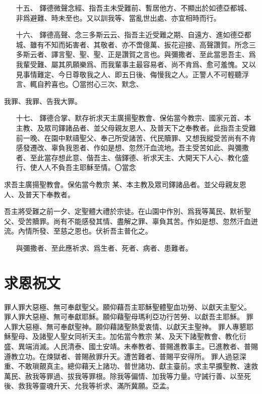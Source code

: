\begin{enumerate}
    \item[十五、]{\small 鐸德微聲念經、指吾主未受難前、暫居他方、不顯出於如德亞都城、非爲避難、時未至也。又以訓我等、當亂世出處、亦宜相時而行。}
    \item[十六、]{\small 鐸德高聲、念三多斯云云、指吾主近受難之期、自遠方、進如德亞都城、雖有不知而妬害者、其敬者、亦不啻億萬、扳花迎接、高聲讚賀。所念三多斯云者、譯言聖、聖、聖、正是讚賀之言也。與彌撒者、至此當思吾主、爲我輩受難、屬其夙願樂爲、而我輩事主最容易者、尚不肯爲、愈可羞愧。又以見事情難定、今日尊敬我之人、即五日後、侮慢我之人。正警人不可輕聽浮言、輒自矜喜也。〇當拊心三次、默念、}
\end{enumerate}
我罪、我罪、告我大罪。
\begin{enumerate}
    \item[十七、]{\small 鐸德合掌、默存祈求天主廣揚聖教會、保佑當今教宗、國家元首、本主教、及眾司鐸諸品者、並父母親友恩人、及普天下之奉教者。此指吾主受難前一晚、在園中默禱聖父、奉己所受諸苦、代民贖罪、又想我縱受苦尚有不肯感發遷改、辜負我恩者、作如是想、忽然汗血流地。吾主受苦如此、與彌撒者、至此當存想此意、偕吾主、偕鐸德、祈求天主、大開天下人心、教化盛行、使人人不負吾主耶穌至情。〇當念}
\end{enumerate}
求吾主廣揚聖教會。保佑當今教宗 某、本主教及眾司鐸諸品者。並父母親友恩人、及普天下奉教者。

吾主將受難之前一夕、定聖體大禮於宗徒。在山園中作別、爲我等萬民、默祈聖父、受苦贖罪。尚有不能感發其情、盡解之罪、辜負其苦。作如是想、忽然汗血迸流。內情所發、至慈之恩也。伏祈吾主普化之。

\begin{enumerate}
    \item[]{\small 與彌撒者、至此應祈求、爲生者、死者、病者、患難者。}
\end{enumerate}
 
\section*{求恩祝文}
罪人罪大惡極、無可奉獻聖父。願仰藉吾主耶穌聖體聖血功勞、以獻天主聖父。  罪人罪大惡極、無可奉獻耶穌。願仰藉聖母瑪利亞功行苦勞、以獻吾主耶穌。  罪人罪大惡極、無可奉獻聖神。願仰藉諸聖熱愛衷情、以獻天主聖神。  罪人專懇耶穌聖母、及諸聖人聖女同祈天主。加佑當今教宗 某、及天下諸聖教會、教化衍盛、異端消滅。人民清泰、國土安靖。未奉教者、普賜進教事主。已進教者、普賜遵教立功。在煉獄者、普賜赦罪升天。遭苦難者、普賜平安得所。  罪人過惡深重、不敢瑣覿真主。總仰藉天上諸功、普世諸功、獻主臺前。求主早擴聖教、速救萬民、赦我等罪過、拔我等罪根。除我等偏情、加我等力量。守誡行善、以至死後、救我等靈魂升天、允我等祈求、滿所冀願。{\cspace}亞孟。

